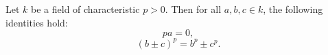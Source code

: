 Let $k$ be a field of characteristic $p > 0$. Then for all $a, b, c \in k$, the following identities hold:
$$
pa = 0,
$$
$$
(b \pm c)^p = b^p \pm c^p.
$$
